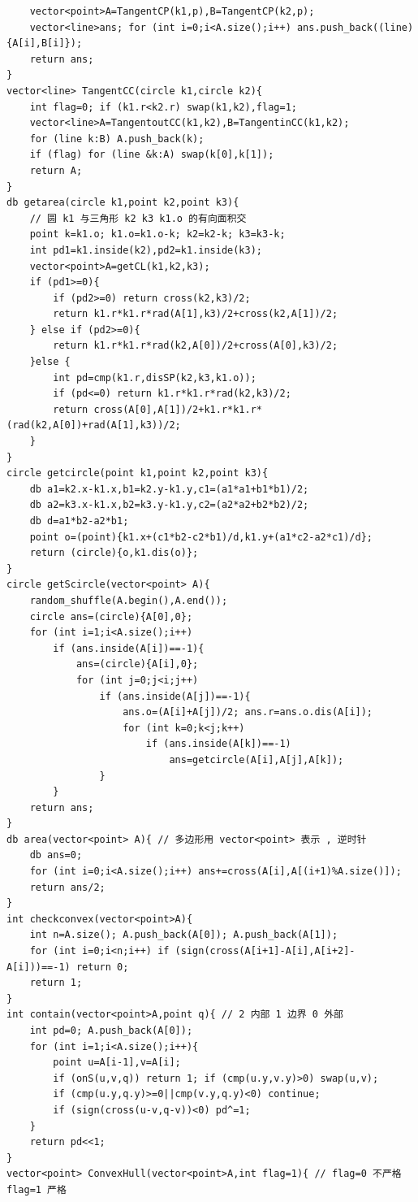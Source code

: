 \documentclass[twoside]{article}
\begin{document}
\begin{lstlisting}
    vector<point>A=TangentCP(k1,p),B=TangentCP(k2,p);
    vector<line>ans; for (int i=0;i<A.size();i++) ans.push_back((line){A[i],B[i]}); 
    return ans;
}
vector<line> TangentCC(circle k1,circle k2){
    int flag=0; if (k1.r<k2.r) swap(k1,k2),flag=1;
    vector<line>A=TangentoutCC(k1,k2),B=TangentinCC(k1,k2);
    for (line k:B) A.push_back(k); 
    if (flag) for (line &k:A) swap(k[0],k[1]);
    return A;
}
db getarea(circle k1,point k2,point k3){
    // 圆 k1 与三角形 k2 k3 k1.o 的有向面积交
    point k=k1.o; k1.o=k1.o-k; k2=k2-k; k3=k3-k;
    int pd1=k1.inside(k2),pd2=k1.inside(k3); 
    vector<point>A=getCL(k1,k2,k3);
    if (pd1>=0){
        if (pd2>=0) return cross(k2,k3)/2;
        return k1.r*k1.r*rad(A[1],k3)/2+cross(k2,A[1])/2;
    } else if (pd2>=0){ 
        return k1.r*k1.r*rad(k2,A[0])/2+cross(A[0],k3)/2;
    }else {
        int pd=cmp(k1.r,disSP(k2,k3,k1.o));
        if (pd<=0) return k1.r*k1.r*rad(k2,k3)/2;
        return cross(A[0],A[1])/2+k1.r*k1.r*(rad(k2,A[0])+rad(A[1],k3))/2;
    }
}
circle getcircle(point k1,point k2,point k3){
    db a1=k2.x-k1.x,b1=k2.y-k1.y,c1=(a1*a1+b1*b1)/2;
    db a2=k3.x-k1.x,b2=k3.y-k1.y,c2=(a2*a2+b2*b2)/2;
    db d=a1*b2-a2*b1;
    point o=(point){k1.x+(c1*b2-c2*b1)/d,k1.y+(a1*c2-a2*c1)/d};
    return (circle){o,k1.dis(o)};
}
circle getScircle(vector<point> A){
    random_shuffle(A.begin(),A.end());
    circle ans=(circle){A[0],0};
    for (int i=1;i<A.size();i++)
        if (ans.inside(A[i])==-1){
            ans=(circle){A[i],0};
            for (int j=0;j<i;j++)
                if (ans.inside(A[j])==-1){
                    ans.o=(A[i]+A[j])/2; ans.r=ans.o.dis(A[i]);
                    for (int k=0;k<j;k++)
                        if (ans.inside(A[k])==-1)
                            ans=getcircle(A[i],A[j],A[k]);
                }
        }
    return ans;
}
db area(vector<point> A){ // 多边形用 vector<point> 表示 , 逆时针 
    db ans=0;
    for (int i=0;i<A.size();i++) ans+=cross(A[i],A[(i+1)%A.size()]);
    return ans/2;
}
int checkconvex(vector<point>A){
    int n=A.size(); A.push_back(A[0]); A.push_back(A[1]);
    for (int i=0;i<n;i++) if (sign(cross(A[i+1]-A[i],A[i+2]-A[i]))==-1) return 0;
    return 1;
}
int contain(vector<point>A,point q){ // 2 内部 1 边界 0 外部
    int pd=0; A.push_back(A[0]);
    for (int i=1;i<A.size();i++){
        point u=A[i-1],v=A[i];
        if (onS(u,v,q)) return 1; if (cmp(u.y,v.y)>0) swap(u,v);
        if (cmp(u.y,q.y)>=0||cmp(v.y,q.y)<0) continue;
        if (sign(cross(u-v,q-v))<0) pd^=1;
    }
    return pd<<1;
}
vector<point> ConvexHull(vector<point>A,int flag=1){ // flag=0 不严格 flag=1 严格 

\end{lstlisting}
\end{document}
